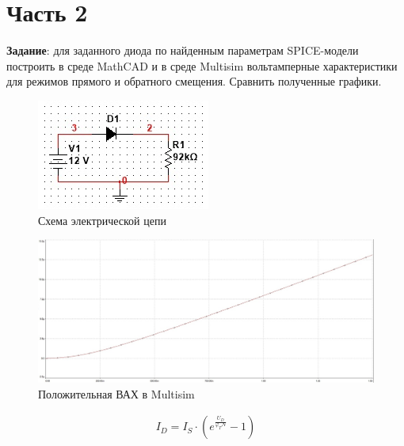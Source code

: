 \documentclass{labreport}
\begin{document}
\chapter{Часть 2}

\textbf{Задание}: для заданного диода по найденным параметрам SPICE-модели построить в среде MathCAD и в среде Multisim вольтамперные характеристики для режимов прямого и обратного смещения. Сравнить полученные графики.

\begin{figure}[h]
    \centering
    \includegraphics{ek_schema1.jpg}
    \caption{Схема электрической цепи}
\end{figure}


\begin{figure}[h]
    \centering
    \includegraphics[width=\linewidth]{ek_graph_pos_m.jpg}
    \caption{Положительная ВАХ в Multisim}
\end{figure}


\begin{gather}
    I_D=I_S\cdot\left(e^{\frac{U_D}{\varphi_TN}}-1\right)
    \label{for:1}
\end{gather}
\end{document}
